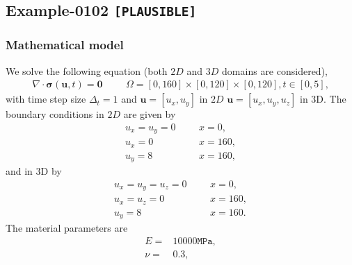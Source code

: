 %
\clearpage
%
\subsection{Example-0102 \texttt{[PLAUSIBLE]}}
%
%
\subsubsection{Mathematical model}
%
We solve the following equation (both $2D$ and $3D$ domains are considered),
%
\begin{align}
    \nabla \cdot \boldsymbol{\sigma} (\boldsymbol{u}, t) = \boldsymbol{0} & &&\Omega = [0, 160] \times [0, 120] \times [0, 120], t \in [0, 5],
\end{align}
%
with time step size $\Delta_t = 1$ and $\boldsymbol{u} = [u_x,u_y]$ in $2D$ $\boldsymbol{u} = [u_x,u_y,u_z]$ in 3D. The boundary conditions in $2D$ are given by
%
\begin{align}
    u_x = u_y = 0 & &&x = 0, \\
		u_x = 0 & &&x = 160, \\
		u_y = 8 & &&x = 160,
\end{align}
%
and in 3D by
%
\begin{align}
    u_x = u_y = u_z = 0 & &&x = 0, \\
		u_x = u_z = 0 & &&x = 160, \\
		u_y = 8 & &&x = 160.
\end{align}
%
The material parameters are
%
\begin{align}
    E = & 10000\texttt{MPa}, \\
    \nu = & 0.3, \\
\end{align}
%
%
